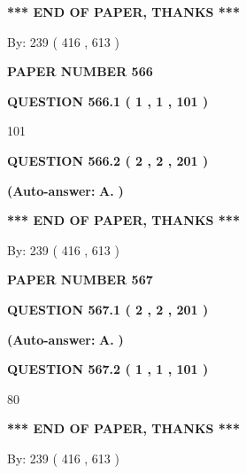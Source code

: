 \documentclass{ctexart}
\begin{document}
 
   
   
   
   
\vspace{1.0in} 
{\textbf{\large{ *** END OF PAPER, THANKS *** }}} 
   
   
\hspace{1.0in} By: 
 239 ( 416 ,  613 )
   
   
   
   
\newpage 
\setcounter{page}{ 
   566001 } 
   
   
 {\textbf{ \Large{ PAPER NUMBER  566  }}}
   
   
   
   
  
  
{\textbf{\large{QUESTION
566.1 
 ( 1 , 1 , 101 )
}}}

101
  
  
{\textbf{\large{QUESTION
566.2 
 ( 2 , 2 , 201 )
}}}
 
 
{\textbf{(Auto-answer:}}
{\textbf{\large{
A.}}}
{\textbf{)}}
 
 
   
   
   
   
\vspace{1.0in} 
{\textbf{\large{ *** END OF PAPER, THANKS *** }}} 
   
   
\hspace{1.0in} By: 
 239 ( 416 ,  613 )
   
   
   
   
\newpage 
\setcounter{page}{ 
   567001 } 
   
   
 {\textbf{ \Large{ PAPER NUMBER  567  }}}
   
   
   
   
  
  
{\textbf{\large{QUESTION
567.1 
 ( 2 , 2 , 201 )
}}}
 
 
{\textbf{(Auto-answer:}}
{\textbf{\large{
A.}}}
{\textbf{)}}
 
 
  
  
{\textbf{\large{QUESTION
567.2 
 ( 1 , 1 , 101 )
}}}

80
   
   
   
   
\vspace{1.0in} 
{\textbf{\large{ *** END OF PAPER, THANKS *** }}} 
   
   
\hspace{1.0in} By: 
 239 ( 416 ,  613 )
   
   
   
   
\newpage 
\setcounter{page}{ 
   568001 } 
   
\end{document}
